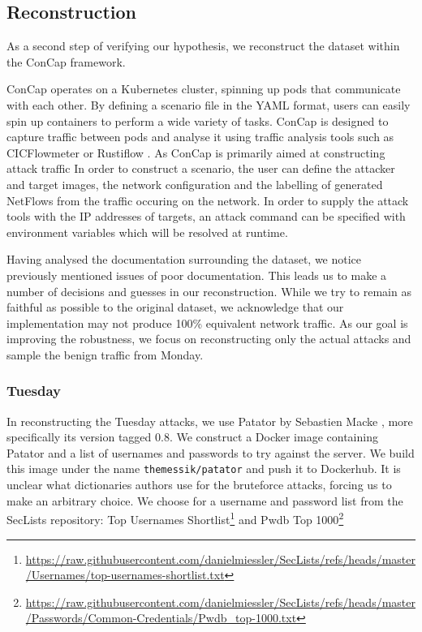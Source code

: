 \subsection{Reconstruction} \label{reconstruction}

As a second step of verifying our hypothesis, we reconstruct the dataset within the ConCap framework. 

ConCap operates on a Kubernetes cluster, spinning up pods that communicate with each other. 
By defining a scenario file in the YAML format, users can easily spin up containers to perform a wide variety of tasks. 
ConCap is designed to capture traffic between pods and analyse it using traffic analysis tools such as CICFlowmeter \cite{cicflowmeter} or Rustiflow \cite{rustiflow}. As ConCap is primarily aimed at constructing attack traffic
In order to construct a scenario, the user can define the attacker and target images, the network configuration and the labelling of generated NetFlows from the traffic occuring on the network. In order to supply the attack tools with the IP addresses of targets, an attack command can be specified with environment variables which will be resolved at runtime.

Having analysed the documentation surrounding the dataset, we notice previously mentioned issues of poor documentation. This leads us to make a number of decisions and guesses in our reconstruction. While we try to remain as faithful as possible to the original dataset, we acknowledge that our implementation may not produce 100\% equivalent network traffic. As our goal is improving the robustness, we focus on reconstructing only the actual attacks and sample the benign traffic from Monday. 

\subsubsection{Tuesday}
In reconstructing the Tuesday attacks, we use Patator by Sebastien Macke \cite{patator}, more specifically its version tagged 0.8. We construct a Docker image containing Patator and a list of usernames and passwords to try against the server. We build this image under the name \texttt{themessik/patator} and push it to Dockerhub. It is unclear what dictionaries authors use for the bruteforce attacks, forcing us to make an arbitrary choice. We choose for a username and password list from the SecLists \cite{seclists} repository: Top Usernames Shortlist\footnote{\url{https://raw.githubusercontent.com/danielmiessler/SecLists/refs/heads/master/Usernames/top-usernames-shortlist.txt}} and Pwdb Top 1000\footnote{\url{https://raw.githubusercontent.com/danielmiessler/SecLists/refs/heads/master/Passwords/Common-Credentials/Pwdb_top-1000.txt}}

